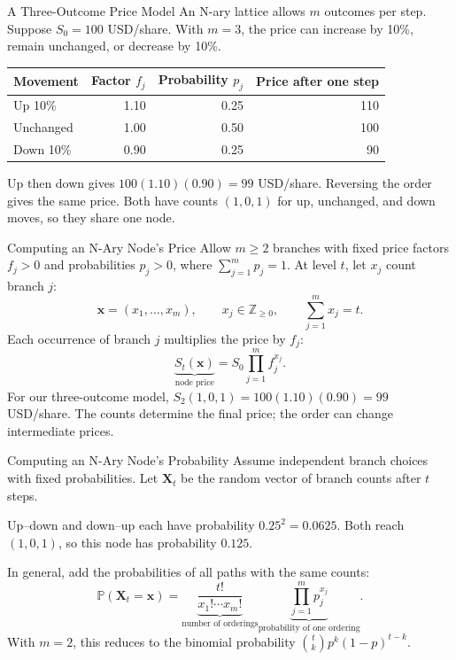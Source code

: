\documentclass[aspectratio=169,11pt]{beamer}
\newcommand{\Pmeasure}{\mathbb{P}}
\begin{document}
\begin{frame}{A Three-Outcome Price Model}
An N-ary lattice allows $m$ outcomes per step. Suppose $S_0=100$ USD/share.
  With $m=3$, the price can increase by 10\%,
  remain unchanged, or decrease by 10\%.

  \vspace{0.6em}
  \begin{center}
    \renewcommand{\arraystretch}{1.3}
    \begin{tabular}{lrrr}
      \toprule
      Movement & Factor $f_j$ & Probability $p_j$ & Price after one step\\
      \midrule
      Up 10\% & 1.10 & 0.25 & 110\\
      Unchanged & 1.00 & 0.50 & 100\\
      Down 10\% & 0.90 & 0.25 & 90\\
      \bottomrule
    \end{tabular}
  \end{center}

  \vspace{0.5em}
  Up then down gives $100(1.10)(0.90)=99$ USD/share. Reversing the order gives
  the same price. Both have counts $(1,0,1)$ for up, unchanged, and down moves, so they share one node.
\end{frame}

\begin{frame}{Computing an N-Ary Node's Price}
Allow $m\ge2$ branches with fixed price factors $f_j>0$ and probabilities
  $p_j>0$, where $\sum_{j=1}^mp_j=1$. At level $t$, let $x_j$ count branch $j$:
  \[
    \mathbf{x}=(x_1,\ldots,x_m),\qquad
    x_j\in\mathbb{Z}_{\ge0},\qquad \sum_{j=1}^mx_j=t.
  \]
  Each occurrence of branch $j$ multiplies the price by $f_j$:
  \[
    \underbrace{S_t(\mathbf{x})}_{\text{node price}}
    =S_0\prod_{j=1}^mf_j^{x_j}.
  \]
  For our three-outcome model, $S_2(1,0,1)=100(1.10)(0.90)=99$ USD/share.
  The counts determine the final price; the order can change intermediate prices.
\end{frame}

\begin{frame}{Computing an N-Ary Node's Probability}
Assume independent branch choices with fixed probabilities.
  Let $\mathbf{X}_t$ be the random vector of branch counts after $t$ steps.

  \vspace{0.5em}
  Up--down and down--up each have probability $0.25^2=0.0625$.
  Both reach $(1,0,1)$, so this node has probability $0.125$.

  \vspace{0.5em}
  In general, add the probabilities of all paths with the same counts:
  \[
    \Pmeasure(\mathbf{X}_t=\mathbf{x})
    =\underbrace{\frac{t!}{x_1!\cdots x_m!}}_{\text{number of orderings}}
     \underbrace{\prod_{j=1}^mp_j^{x_j}}_{\text{probability of one ordering}}.
  \]
  With $m=2$, this reduces to the binomial probability
  $\binom tk p^k(1-p)^{t-k}$.
\end{frame}
\end{document}
